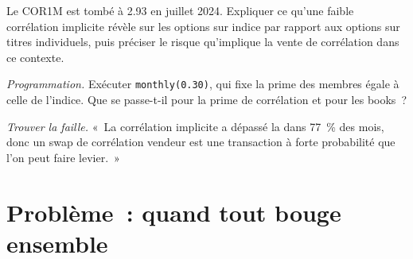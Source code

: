 \begin{exercise}[$\star\star$]\label{exo:s2:dispersion-and-correlation:6}
Le COR1M est tombé à 2.93 en juillet 2024. Expliquer ce qu'une faible corrélation implicite révèle sur les options sur indice
par rapport aux options sur titres individuels, puis préciser le risque qu'implique la vente de corrélation dans ce contexte.
\end{exercise}

\begin{exercise}[$\star\star\star$]\label{exo:s2:dispersion-and-correlation:7}
\emph{Programmation.} Exécuter \texttt{monthly(0.30)}, qui fixe la prime des membres égale à celle de l'indice. Que se passe-t-il pour la prime de corrélation et
pour les books~?
\end{exercise}

\begin{exercise}[$\star\star\star$]\label{exo:s2:dispersion-and-correlation:8}
\emph{Trouver la faille.} «~La corrélation implicite a dépassé la  dans 77~\% des mois, donc un swap de corrélation vendeur est une transaction à forte probabilité que l'on peut
faire levier.~»
\end{exercise}

\section{Problème~: quand tout bouge ensemble}

